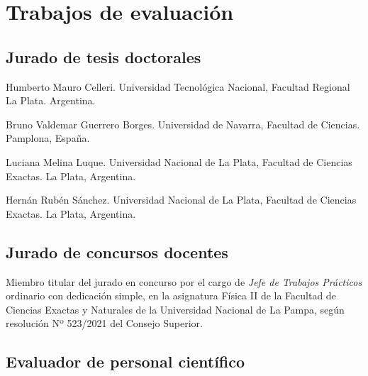 \section{Trabajos de evaluación}

\subsection{Jurado de tesis doctorales}

 Humberto Mauro Celleri. Universidad Tecnológica Nacional, Facultad Regional La Plata. Argentina.

 Bruno Valdemar Guerrero Borges. Universidad de Navarra, Facultad de Ciencias. Pamplona, España.

 Luciana Melina Luque. Universidad Nacional de La Plata, Facultad de Ciencias Exactas. La Plata, Argentina.

 Hernán Rubén Sánchez. Universidad Nacional de La Plata, Facultad de Ciencias Exactas. La Plata, Argentina.

\subsection{Jurado de concursos docentes}

 Miembro titular del jurado en concurso por el cargo de \textit{Jefe de Trabajos Prácticos} ordinario con dedicación simple, en la asignatura Física II de la Facultad de Ciencias Exactas y Naturales de la Universidad Nacional de La Pampa, según resolución Nº 523/2021 del Consejo Superior.


\subsection{Evaluador de personal científico}

